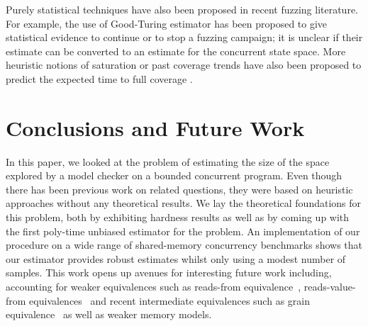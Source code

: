 \documentclass[acmsmall]{acmart}
\begin{document}
Purely statistical techniques have also been proposed in recent  fuzzing literature.
For example, the use of Good-Turing estimator \cite{10.1145/3210309, 10.1145/3611019,10.1145/3468264.3468570} has been proposed to give statistical evidence to continue or to stop a fuzzing campaign; it is unclear if their estimate can
be converted to an estimate for the concurrent state space.
More heuristic notions of saturation or past coverage trends have also been proposed to predict the expected time to full coverage  \cite{10.1145/3597503.3639198,10.1145/3597926.3598043}. 
%





\section{Conclusions and Future Work}

In this paper, we looked at the problem of estimating the size of the space explored by a model checker on a bounded concurrent program. Even though there has been previous work on related questions, they were based on heuristic approaches without any theoretical results. 
We lay the theoretical foundations for this problem, both by exhibiting hardness results as well as by coming up with the first poly-time unbiased estimator for the problem. 
An implementation of our procedure on a wide range of shared-memory concurrency benchmarks shows that our estimator provides robust estimates whilst only using a modest number of samples.
This work  opens up avenues for interesting future work including, accounting 
for weaker equivalences such as reads-from equivalence~\cite{readsFrom2019},
reads-value-from equivalences~\cite{readsValue2021} and recent intermediate
equivalences such as grain equivalence~\cite{FarzanMathur2024} as well as weaker memory models.
\end{document}
